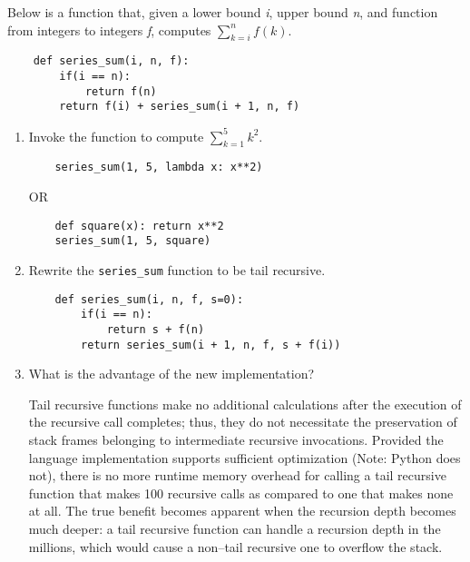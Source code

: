 %
%


Below is a function that, given a lower bound \textit{i}, upper bound \textit{n}, and function from integers to integers \textit{f}, computes $\sum\limits_{k=i}^n f(k)$.
\begin{lstlisting}
	def series_sum(i, n, f):
		if(i == n):
			return f(n)
		return f(i) + series_sum(i + 1, n, f)
\end{lstlisting}
\begin{enumerate}
\item Invoke the function to compute $\sum\limits_{k=1}^5 k^2$.
\begin{answer}
\begin{multicols}{3}
\begin{verbatim}
	series_sum(1, 5, lambda x: x**2)
\end{verbatim}
\columnbreak
\hspace{80pt} OR
\columnbreak
\begin{verbatim}
	def square(x): return x**2
	series_sum(1, 5, square)
\end{verbatim}
\end{multicols}
\end{answer}

\item Rewrite the \texttt{series\_sum} function to be tail recursive.
\begin{answer}
\begin{lstlisting}
	def series_sum(i, n, f, s=0):
		if(i == n):
			return s + f(n)
		return series_sum(i + 1, n, f, s + f(i))
\end{lstlisting}
\end{answer}

\vspace{48pt}
\item What is the advantage of the new implementation? \\
\begin{answer}
Tail recursive functions make no additional calculations after the execution of the recursive call completes; thus, they do not necessitate the preservation of stack frames belonging to intermediate recursive invocations.
Provided the language implementation supports sufficient optimization (Note: Python does not), there is no more runtime memory overhead for calling a tail recursive function that makes 100 recursive calls as compared to one that makes none at all.
The true benefit becomes apparent when the recursion depth becomes much deeper: a tail recursive function can handle a recursion depth in the millions, which would cause a non--tail recursive one to overflow the stack.
\end{answer}
\end{enumerate}
